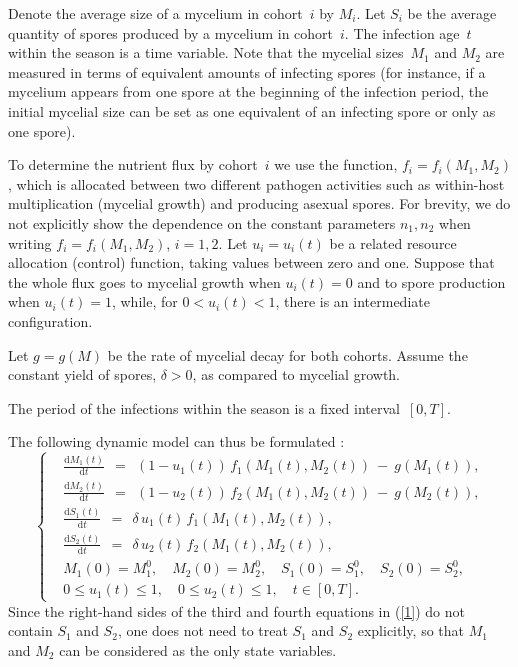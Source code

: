 \documentclass[11pt]{amsart}
\begin{document}
Denote the average size of a mycelium in cohort~$ i $ by $ M_i $. Let $ S_i $ be the average quantity of spores produced by a mycelium
in cohort~$ i $. The infection age~$ t $ within the season is a time variable. Note that the mycelial sizes~$ M_1 $ and
$ M_2 $ are measured in terms of equivalent amounts of infecting spores (for instance, if a mycelium appears from one spore at
the beginning of the infection period, the initial mycelial size can be set as one equivalent of an infecting spore or only as one
spore).

To determine the nutrient flux by cohort~$ i $ we use the function, $ f_i = f_i(M_1, M_2) $, which is allocated 
between two
different pathogen activities such as within-host multiplication (mycelial growth) and producing asexual spores.
For brevity, we do not explicitly show the dependence on the constant parameters $ n_1, n_2 $ when writing $ f_i = f_i(M_1, M_2) $,
$ i = 1,2 $. Let $ u_i = u_i(t) $ be a related resource allocation (control) function, taking values between zero and one. Suppose that
the whole flux goes to mycelial growth when $ u_i(t) = 0 $ and to spore production when $ u_i(t) = 1 $, while, for $ 0 < u_i(t) < 1 $,
there is an intermediate configuration.

Let $ g = g(M) $ be the rate of mycelial decay for both cohorts. Assume the constant yield of spores, $ \delta > 0 $, as compared to mycelial growth.

The period of the infections within the season is a fixed interval~$ [0, T] $.

The following dynamic model can thus be formulated \cite{YegorovGrognardMailleretHalkettBernhard2019}:
\begin{equation}
\left\{ \begin{aligned}
& \frac{\mathrm{d} M_1(t)}{\mathrm{d} t} \:\: = \:\: (1 - u_1(t)) \, f_1(M_1(t), M_2(t)) \: - \: g(M_1(t)), \\
& \frac{\mathrm{d} M_2(t)}{\mathrm{d} t} \:\: = \:\: (1 - u_2(t)) \, f_2(M_1(t), M_2(t)) \: - \: g(M_2(t)), \\
& \frac{\mathrm{d} S_1(t)}{\mathrm{d} t} \:\: = \:\: \delta \, u_1(t) \, f_1(M_1(t), M_2(t)), \\
& \frac{\mathrm{d} S_2(t)}{\mathrm{d} t} \:\: = \:\: \delta \, u_2(t) \, f_2(M_1(t), M_2(t)), \\
& M_1(0) = M_1^0, \quad M_2(0) = M_2^0, \quad S_1(0) = S_1^0, \quad S_2(0) = S_2^0, \\
& 0 \leqslant u_1(t) \leqslant 1, \quad 0 \leqslant u_2(t) \leqslant 1, \quad t \in [0, T].
\end{aligned} \right.  \label{1}
\end{equation}
Since the right-hand sides of the third and fourth equations in (\ref{1}) do not contain $ S_1 $ and $ S_2 $, one does not need
to treat $ S_1 $ and $ S_2 $ explicitly, so that $ M_1 $ and $ M_2 $ can be considered as the only state variables.
\end{document}
